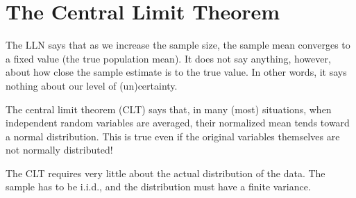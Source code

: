 


\section{The Central Limit Theorem}
The LLN says that as we increase the sample size, the sample mean converges to a fixed value (the true population mean).  It does not say anything, however, about how close the sample estimate is to the true value. In other words, it says nothing about our level of (un)certainty. 

The central limit theorem (CLT) says that, in many (most) situations, when independent random variables are averaged, their normalized mean tends toward a normal distribution. This is true even if the original variables themselves are not normally distributed!

The CLT requires very little about the actual distribution of the data. The sample has to be i.i.d., and the distribution must have a finite variance. 


